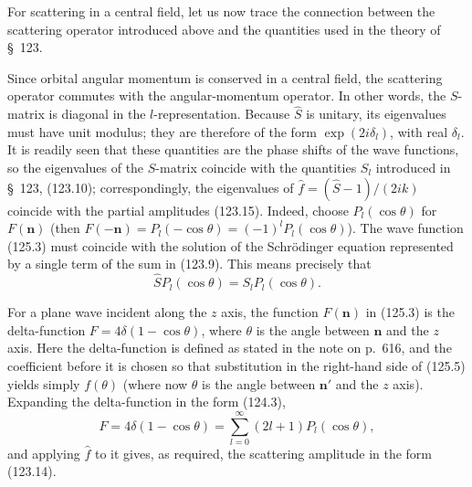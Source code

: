 For scattering in a central field, let us now trace the connection between
the scattering operator introduced above and the quantities used in the
theory of \S~123.

Since orbital angular momentum is conserved in a central field, the
scattering operator commutes with the angular-momentum operator. In other
words, the $S$-matrix is diagonal in the $l$-representation. Because $\hat S$
is unitary, its eigenvalues must have unit modulus; they are therefore of the
form $\exp(2i\delta_l)$, with real $\delta_l$. It is readily seen that these
quantities are the phase shifts of the wave functions, so the eigenvalues of
the $S$-matrix coincide with the quantities $S_l$ introduced in \S~123,
(123.10); correspondingly, the eigenvalues of
$\hat f=(\hat S-1)/(2ik)$ coincide with the partial amplitudes (123.15).
Indeed, choose $P_l(\cos\theta)$ for $F(\mathbf n)$ (then
$F(-\mathbf n)=P_l(-\cos\theta)=(-1)^lP_l(\cos\theta)$). The wave function
(125.3) must coincide with the solution of the Schrödinger equation
represented by a single term of the sum in (123.9). This means precisely that
\[
 \hat SP_l(\cos\theta)=S_lP_l(\cos\theta).
\]

For a plane wave incident along the $z$ axis, the function $F(\mathbf n)$ in
(125.3) is the delta-function $F=4\delta(1-\cos\theta)$, where $\theta$ is the
angle between $\mathbf n$ and the $z$ axis. Here the delta-function is defined
as stated in the note on p.~616, and the coefficient before it is chosen so
that substitution in the right-hand side of (125.5) yields simply
$f(\theta)$ (where now $\theta$ is the angle between $\mathbf n'$ and the
$z$ axis). Expanding the delta-function in the form (124.3),
\begin{equation}
 F=4\delta(1-\cos\theta)=\sum_{l=0}^{\infty}(2l+1)P_l(\cos\theta),
 \tag{125.17}
\end{equation}
and applying $\hat f$ to it gives, as required, the scattering amplitude in
the form (123.14).

